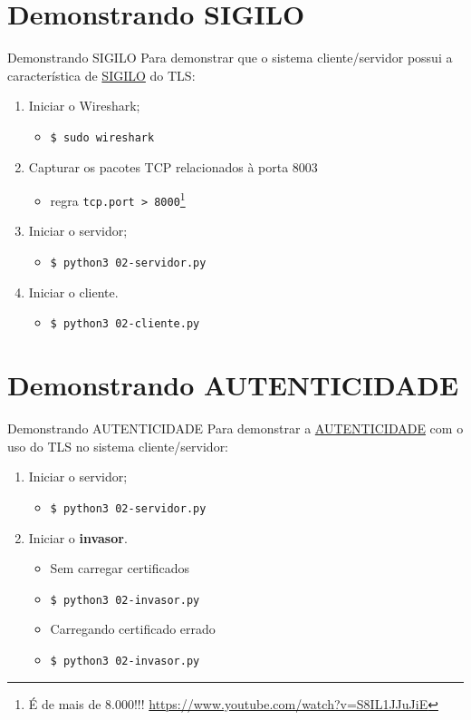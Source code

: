 \documentclass[xcolor=dvipsnames,table]{beamer}
\begin{document}
\section{Demonstrando SIGILO}
\begin{frame}{Demonstrando SIGILO}
	Para demonstrar que o sistema cliente/servidor possui a característica de \underline{SIGILO} do TLS:
	\begin{enumerate}
		\item Iniciar o Wireshark;
		\begin{itemize}
			\item \texttt{\$ sudo wireshark}
		\end{itemize}
		\item Capturar os pacotes TCP relacionados à porta 8003
		\begin{itemize}
			\item regra \texttt{tcp.port > 8000}\footnote{É de mais de 8.000!!! \url{https://www.youtube.com/watch?v=S8IL1JJuJiE}}
		\end{itemize}
		\item Iniciar o servidor;
		\begin{itemize}
			\item \texttt{\$ python3 02-servidor.py}
		\end{itemize}
		\item Iniciar o cliente.
		\begin{itemize}
			\item \texttt{\$ python3 02-cliente.py}
		\end{itemize}
	\end{enumerate}
\end{frame}

\section{Demonstrando AUTENTICIDADE}
\begin{frame}{Demonstrando AUTENTICIDADE}
	Para demonstrar a \underline{AUTENTICIDADE} com o uso do TLS no sistema cliente/servidor:
	\begin{enumerate}
		\item Iniciar o servidor;
		\begin{itemize}
			\item \texttt{\$ python3 02-servidor.py}
		\end{itemize}
		\item Iniciar o \textbf{invasor}.
		\begin{itemize}
			\item Sem carregar certificados
			\item \texttt{\$ python3 02-invasor.py} \pause
			\item Carregando certificado errado
			\item \texttt{\$ python3 02-invasor.py}
		\end{itemize}
	\end{enumerate}
\end{frame}
\end{document}
